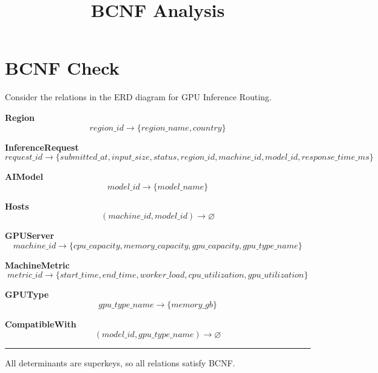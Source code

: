 \documentclass{article}
\title{BCNF Analysis}
\author{}
\date{}
\begin{document}
\maketitle

\section{BCNF Check}

Consider the relations in the ERD diagram for GPU Inference Routing.

\textbf{Region}
\[
region\_id \to \{region\_name, country\}
\]

\textbf{InferenceRequest}
\[
request\_id \to \{submitted\_at, input\_size, status, region\_id, machine\_id, model\_id, response\_time\_ms\}
\]

\textbf{AIModel}
\[
model\_id \to \{model\_name\}
\]

\textbf{Hosts}
\[
(machine\_id, model\_id) \rightarrow \varnothing
\]

\textbf{GPUServer}
\[
machine\_id \to \{cpu\_capacity, memory\_capacity, gpu\_capacity, gpu\_type\_name\}
\]

\textbf{MachineMetric}
\[
metric\_id \to \{start\_time, end\_time, worker\_load, cpu\_utilization, gpu\_utilization\}
\]

\textbf{GPUType}
\[
gpu\_type\_name \to \{memory\_gb\}
\]

\textbf{CompatibleWith}
\[
(model\_id, gpu\_type\_name) \rightarrow \varnothing
\]

\bigskip
\hrule
\bigskip

All determinants are superkeys, so all relations satisfy BCNF.
\end{document}
